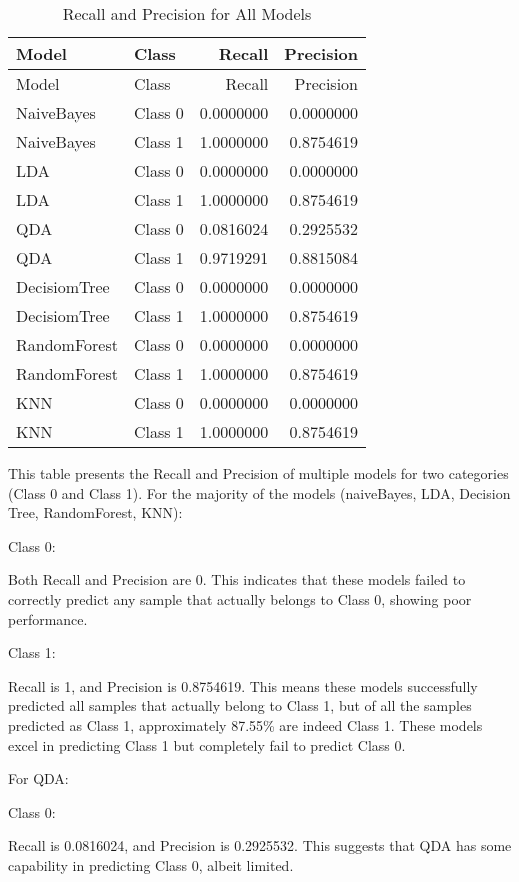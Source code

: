 \documentclass[
]{article}
\begin{document}
\begin{longtable}[]{@{}llrr@{}}
\caption{Recall and Precision for All Models}\tabularnewline
\toprule\noalign{}
Model & Class & Recall & Precision \\
\midrule\noalign{}
\endfirsthead
\toprule\noalign{}
Model & Class & Recall & Precision \\
\midrule\noalign{}
\endhead
\bottomrule\noalign{}
\endlastfoot
NaiveBayes & Class 0 & 0.0000000 & 0.0000000 \\
NaiveBayes & Class 1 & 1.0000000 & 0.8754619 \\
LDA & Class 0 & 0.0000000 & 0.0000000 \\
LDA & Class 1 & 1.0000000 & 0.8754619 \\
QDA & Class 0 & 0.0816024 & 0.2925532 \\
QDA & Class 1 & 0.9719291 & 0.8815084 \\
DecisiomTree & Class 0 & 0.0000000 & 0.0000000 \\
DecisiomTree & Class 1 & 1.0000000 & 0.8754619 \\
RandomForest & Class 0 & 0.0000000 & 0.0000000 \\
RandomForest & Class 1 & 1.0000000 & 0.8754619 \\
KNN & Class 0 & 0.0000000 & 0.0000000 \\
KNN & Class 1 & 1.0000000 & 0.8754619 \\
\end{longtable}

This table presents the Recall and Precision of multiple models for two
categories (Class 0 and Class 1). For the majority of the models
(naiveBayes, LDA, Decision Tree, RandomForest, KNN):

Class 0:

Both Recall and Precision are 0. This indicates that these models failed
to correctly predict any sample that actually belongs to Class 0,
showing poor performance.

Class 1:

Recall is 1, and Precision is 0.8754619. This means these models
successfully predicted all samples that actually belong to Class 1, but
of all the samples predicted as Class 1, approximately 87.55\% are
indeed Class 1. These models excel in predicting Class 1 but completely
fail to predict Class 0.

For QDA:

Class 0:

Recall is 0.0816024, and Precision is 0.2925532. This suggests that QDA
has some capability in predicting Class 0, albeit limited.
\end{document}
